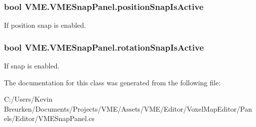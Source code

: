 \subsubsection[{\texorpdfstring{position\+Snap\+Is\+Active}{positionSnapIsActive}}]{\setlength{\rightskip}{0pt plus 5cm}bool V\+M\+E.\+V\+M\+E\+Snap\+Panel.\+position\+Snap\+Is\+Active}\hypertarget{class_v_m_e_1_1_v_m_e_snap_panel_a8969f82f008fef4f0dfdc153f546330d}{}\label{class_v_m_e_1_1_v_m_e_snap_panel_a8969f82f008fef4f0dfdc153f546330d}


If position snap is enabled. 

\subsubsection[{\texorpdfstring{rotation\+Snap\+Is\+Active}{rotationSnapIsActive}}]{\setlength{\rightskip}{0pt plus 5cm}bool V\+M\+E.\+V\+M\+E\+Snap\+Panel.\+rotation\+Snap\+Is\+Active}\hypertarget{class_v_m_e_1_1_v_m_e_snap_panel_a77d0a41f559b90829555a64079f47ccf}{}\label{class_v_m_e_1_1_v_m_e_snap_panel_a77d0a41f559b90829555a64079f47ccf}


If snap is enabled. 



The documentation for this class was generated from the following file\+:\begin{DoxyCompactItemize}
\item 
C\+:/\+Users/\+Kevin Breurken/\+Documents/\+Projects/\+V\+M\+E/\+Assets/\+V\+M\+E/\+Editor/\+Voxel\+Map\+Editor/\+Panels/\+Editor/V\+M\+E\+Snap\+Panel.\+cs\end{DoxyCompactItemize}
